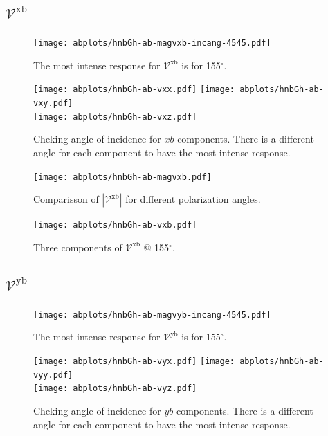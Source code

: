 \documentclass{article}
\let\Oldsubsection\subsection
\renewcommand{\subsection}{\FloatBarrier\Oldsubsection}
\begin{document}
\subsection{$\mathcal{V}^{\mathrm{xb}} $}
\begin{figure}[ht!]
    \centering
    \texttt{[image: abplots/hnbGh-ab-magvxb-incang-4545.pdf]}
    \caption{The most intense response for $\mathcal{V}^{\mathrm{xb}} $ is for 
    155$^{\circ}$.}
    \label{fig:ab-magvxbincang}
\end{figure}
\begin{figure}[ht!]
    \centering
    \texttt{[image: abplots/hnbGh-ab-vxx.pdf]}
    \texttt{[image: abplots/hnbGh-ab-vxy.pdf]}\\
    \texttt{[image: abplots/hnbGh-ab-vxz.pdf]}
    \caption{Cheking angle of incidence for $xb$ components. There is a
    different angle for each component to have the most intense response.}
    \label{fig:ab-xbangcomp}
\end{figure}

\begin{figure}[ht!]
    \centering
    \texttt{[image: abplots/hnbGh-ab-magvxb.pdf]}
    \caption{Comparisson of $|\mathcal{V}^{\mathrm{xb}}|$ for different
    polarization angles.}
    \label{fig:ab-magvxb}
\end{figure}
\begin{figure}[ht!]
    \centering
    \texttt{[image: abplots/hnbGh-ab-vxb.pdf]}
    \caption{Three components of $\mathcal{V}^{\mathrm{xb}} $ @ 155$^{\circ}$.}
    \label{fig:ab-vxb}
\end{figure}

\clearpage

\subsection{$\mathcal{V}^{\mathrm{yb}} $}
\begin{figure}[h!]
    \centering
    \texttt{[image: abplots/hnbGh-ab-magvyb-incang-4545.pdf]}
    \caption{The most intense response for $\mathcal{V}^{\mathrm{yb}} $ is for 
    155$^{\circ}$.}
    \label{fig:ab-magvybincang}
\end{figure}
\begin{figure}[h!]
    \centering
    \texttt{[image: abplots/hnbGh-ab-vyx.pdf]}
    \texttt{[image: abplots/hnbGh-ab-vyy.pdf]}\\
    \texttt{[image: abplots/hnbGh-ab-vyz.pdf]}
    \caption{Cheking angle of incidence for $yb$ components. There is a
    different angle for each component to have the most intense response.}
    \label{fig:ab-ybangcomp}
\end{figure}
\end{document}
